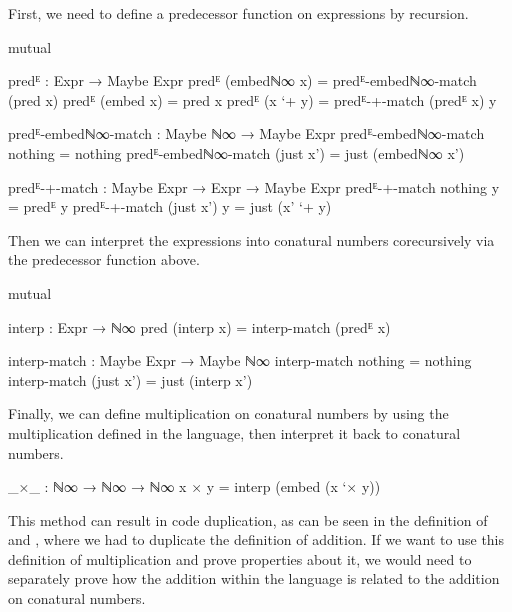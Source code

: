 First, we need to define a predecessor function on expressions by recursion.
\begin{code}[hide]
mutual
\end{code}
\begin{code}
  predᴱ : Expr → Maybe Expr
  predᴱ (embedℕ∞ x)  = predᴱ-embedℕ∞-match (pred x)
  predᴱ (embed x)    = pred x
  predᴱ (x `+ y)     = predᴱ-+-match (predᴱ x) y

  predᴱ-embedℕ∞-match : Maybe ℕ∞ → Maybe Expr
  predᴱ-embedℕ∞-match nothing    = nothing
  predᴱ-embedℕ∞-match (just x')  = just (embedℕ∞ x')

  predᴱ-+-match : Maybe Expr → Expr → Maybe Expr
  predᴱ-+-match nothing    y = predᴱ y
  predᴱ-+-match (just x')  y = just (x' `+ y)
\end{code}
Then we can interpret the expressions into conatural numbers corecursively via
the predecessor function above.
\begin{code}[hide]
mutual
\end{code}
\begin{code}
  interp : Expr → ℕ∞
  pred (interp x) = interp-match (predᴱ x)

  interp-match : Maybe Expr → Maybe ℕ∞
  interp-match nothing    = nothing
  interp-match (just x')  = just (interp x')
\end{code}
Finally, we can define multiplication on conatural numbers by using the
multiplication defined in the language, then interpret it back to conatural
numbers.
\begin{code}
_×_ : ℕ∞ → ℕ∞ → ℕ∞
x × y = interp (embed (x `× y))
\end{code}

This method can result in code duplication, as can be seen in the definition of
 and , where we had to duplicate
the definition of addition. If we want to use this definition of multiplication
and prove properties about it, we would need to separately prove how the
addition within the language is related to the addition on conatural numbers.
